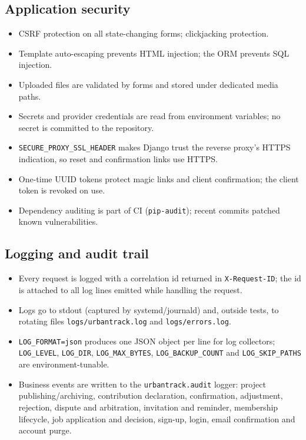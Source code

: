 \documentclass[11pt,a4paper]{article}
\begin{document}
\subsection{Application security}

\begin{itemize}[leftmargin=1.4em,itemsep=3pt]
  \item CSRF protection on all state-changing forms; clickjacking protection.
  \item Template auto-escaping prevents HTML injection; the ORM prevents SQL
        injection.
  \item Uploaded files are validated by forms and stored under dedicated media
        paths.
  \item Secrets and provider credentials are read from environment variables;
        no secret is committed to the repository.
  \item \texttt{SECURE\_PROXY\_SSL\_HEADER} makes Django trust the reverse
        proxy's HTTPS indication, so reset and confirmation links use HTTPS.
  \item One-time UUID tokens protect magic links and client confirmation; the
        client token is revoked on use.
  \item Dependency auditing is part of CI (\texttt{pip-audit}); recent commits
        patched known vulnerabilities.
\end{itemize}

\subsection{Logging and audit trail}

\begin{itemize}[leftmargin=1.4em,itemsep=3pt]
  \item Every request is logged with a correlation id returned in
        \texttt{X-Request-ID}; the id is attached to all log lines emitted while
        handling the request.
  \item Logs go to stdout (captured by systemd/journald) and, outside tests, to
        rotating files \texttt{logs/urbantrack.log} and \texttt{logs/errors.log}.
  \item \texttt{LOG\_FORMAT=json} produces one JSON object per line for log
        collectors; \texttt{LOG\_LEVEL}, \texttt{LOG\_DIR},
        \texttt{LOG\_MAX\_BYTES}, \texttt{LOG\_BACKUP\_COUNT} and
        \texttt{LOG\_SKIP\_PATHS} are environment-tunable.
  \item Business events are written to the \texttt{urbantrack.audit} logger:
        project publishing/archiving, contribution declaration, confirmation,
        adjustment, rejection, dispute and arbitration, invitation and reminder,
        membership lifecycle, job application and decision, sign-up, login,
        email confirmation and account purge.
\end{itemize}
\end{document}
